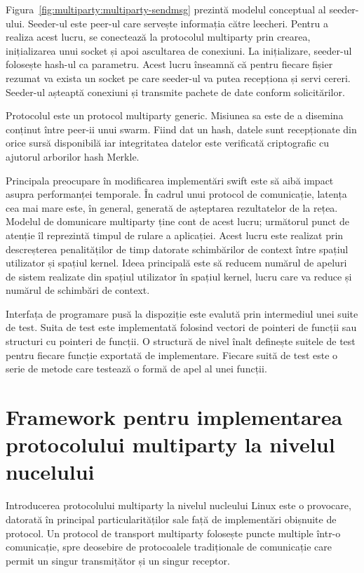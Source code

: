 Figura~\ref{fig:multiparty:multiparty-sendmsg} prezintă modelul conceptual al
seeder-ului. Seeder-ul este peer-ul care servește informația către leecheri.
Pentru a realiza acest lucru, se conectează la protocolul multiparty prin
crearea, inițializarea unui socket și apoi ascultarea de conexiuni. La
inițializare, seeder-ul folosește hash-ul ca parametru. Acest lucru înseamnă
că pentru fiecare fișier rezumat va exista un socket pe care seeder-ul va
putea recepționa și servi cereri. Seeder-ul așteaptă conexiuni și transmite
pachete de date conform solicitărilor.

Protocolul este un protocol multiparty generic. Misiunea sa este de a disemina
conținut între peer-ii unui swarm. Fiind dat un hash, datele sunt recepționate
din orice sursă disponibilă iar integritatea datelor este verificată
criptografic cu ajutorul arborilor hash Merkle.

Principala preocupare în modificarea implementări swift este să aibă impact
asupra performanței temporale. În cadrul unui protocol de comunicație, latența
cea mai mare este, în general, generată de așteptarea rezultatelor de la
rețea. Modelul de domunicare multiparty ține cont de acest lucru; următorul
punct de atenție îl reprezintă timpul de rulare a aplicației. Acest lucru este
realizat prin descreșterea penalităților de timp datorate schimbărilor de
context între spațiul utilizator și spațiul kernel. Ideea principală este să
reducem numărul de apeluri de sistem realizate din spațiul utilizator în
spațiul kernel, lucru care va reduce și numărul de schimbări de context.

Interfața de programare pusă la dispoziție este evalută prin intermediul unei
suite de test. Suita de test este implementată folosind vectori de pointeri de
funcții sau structuri cu pointeri de funcții.  O structură de nivel înalt
definește suitele de test pentru fiecare funcție exportată de implementare.
Fiecare suită de test este o serie de metode care testează o formă de apel
al unei funcții.

\section{Framework pentru implementarea protocolului multiparty la nivelul
nucelului}
\label{sec:multiparty:kernel-framework}

Introducerea protocolului multiparty la nivelul nucleului Linux este o
provocare, datorată în principal particularităților sale față de implementări
obișnuite de protocol. Un protocol de transport multiparty folosește puncte
multiple într-o comunicație, spre deosebire de protocoalele tradiționale de
comunicație care permit un singur transmițător și un singur receptor.

